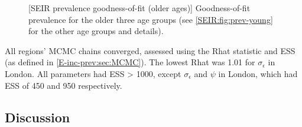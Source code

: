 \documentclass[thesis.tex]{subfiles}
\begin{document}
\begin{figure}
    \vspace{-3cm}
    \captionsetup{width=0.8\paperwidth}
    [SEIR prevalence goodness-of-fit (older ages)]{%
        Goodness-of-fit prevalence for the older three age groups (see \cref{SEIR:fig:prev-young} for the other age groups and details).
    }
    \label{SEIR:fig:prev-old}
\end{figure}

All regions' MCMC chains converged, assessed using the Rhat statistic and ESS (as defined in \cref{E-inc-prev:sec:MCMC}).
The lowest Rhat was 1.01 for $\sigma_\epsilon$ in London.
All parameters had ESS > 1000, except $\sigma_\epsilon$ and $\psi$ in London, which had ESS of 450 and 950 respectively.

\subsection{Discussion} \label{SEIR:sec:discussion}
\end{document}
